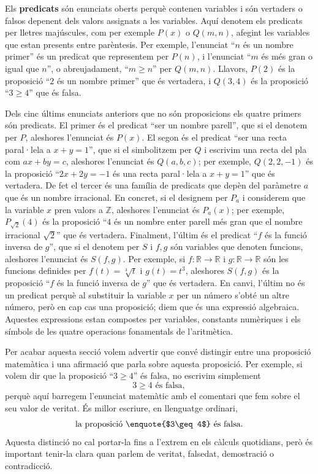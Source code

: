 Els \textbf{predicats} són enunciats oberts perquè contenen
variables i són vertaders o falsos depenent dels valors assignats a les
variables. Aquí denotem els predicats per lletres majúscules, com
per exemple $P(x)$ o $Q(m,n)$, afegint les variables que estan presents
entre parèntesis. Per exemple, l'enunciat \enquote{$n$ és un nombre primer}
és un predicat que representem per $P(n)$, i l'enunciat \enquote{$m$ és més gran o igual que $n$}, o abreujadament, \enquote{$m\geq n$} per $Q(m,n)$.
Llavors, $P(2)$ és la proposició \enquote{$2$ és un nombre primer} que
és vertadera, i $Q(3,4)$ és la proposició \enquote{$3\geq4$} que és
falsa.

Dels cinc últims enunciats anteriors que no són proposicions els
quatre primers són predicats. El primer és el predicat \enquote{ser un
nombre parell}, que si el denotem per $P$, aleshores l'enunciat és $P(x)$. El segon és el predicat \enquote{ser una recta paral·lela a
$x+y=1$}, que si el simbolitzem per $Q$ i escrivim una recta del pla com $ax+by=c$, aleshores l'enunciat és $Q(a,b,c)$; per exemple, $Q(2,2,-1)$
és la proposició \enquote{$2x+2y=-1$ és una recta
paral·lela a $x+y=1$} que és vertadera. De fet el
tercer és una família de predicats que depèn del paràmetre $a$ que és un nombre irracional. En concret, si el designem per $P_{a}$ i
considerem que la variable $x$ pren valors a $\mathbb{Z}$, aleshores
l'enunciat és $P_{a}(x)$; per exemple, $P_{\sqrt{2}}(4)$ és la
proposició \enquote{$4$ és un nombre enter parell més gran que el nombre
irracional $\sqrt{2}$} que és vertadera. Finalment, l'últim és el
predicat \enquote{$f$ és la funció inversa de $g$}, que si el denotem per $S$
i $f,g$ són variables que denoten funcions, aleshores l'enunciat és $S(f,g)$. Per exemple, si $f:\mathbb{R}\to\mathbb{R}$ i $g:\mathbb{R}\to\mathbb{R}$ són les funcions definides per $f(t)=\sqrt[3]{t}$ i $g(t)=t^{3}$, aleshores $S(f,g)$ és la
proposició \enquote{$f$ és la funció inversa de $g$} que és
vertadera. En
canvi, l'últim no és un predicat perquè al substituir la
variable $x$ per un número s'obté un altre número, però en
cap cas una proposició; diem que és una expressió algebraica.
Aquestes expressions estan compostes per variables, constants numèriques
i els símbols de les quatre operacions fonamentals de l'aritmètica.


Per acabar aquesta secció volem advertir que convé distingir entre una proposició matemàtica i una afirmació que parla sobre aquesta proposició. Per exemple, si volem dir que la proposició \enquote{$3\geq 4$} és falsa, no escrivim simplement
\begin{equation*}
3\geq 4\text{ és falsa},
\end{equation*}
perquè aquí barregem l'enunciat matemàtic amb el comentari que fem sobre el seu valor de veritat. És millor escriure, en llenguatge ordinari,
\begin{equation*}
\text{la proposició \enquote{$3\geq 4$} és falsa.}
\end{equation*}
Aquesta distinció no cal portar-la fins a l'extrem en els càlculs quotidians, però és important tenir-la clara quan parlem de veritat, falsedat, demostració o contradicció.

